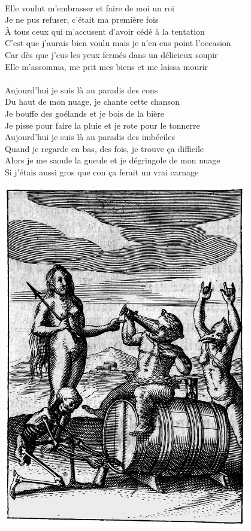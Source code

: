 \\Elle voulut m'embrasser et faire de moi un roi
\\Je ne pus refuser, c'était ma première fois
\\À tous ceux qui m'accusent d'avoir cédé à la tentation
\\C'est que j'aurais bien voulu mais je n'en eus point l'occasion
\\Car dès que j'eus les yeux fermés dans un délicieux soupir
\\Elle m'assomma, me prit mes biens et me laissa mourir
\\\\Aujourd'hui je suis là au paradis des cons
\\Du haut de mon nuage, je chante cette chanson
\\Je bouffe des goélands et je bois de la bière
\\Je pisse pour faire la pluie et je rote pour le tonnerre
\\Aujourd'hui je suis là au paradis des imbéciles
\\Quand je regarde en bas, des fois, je trouve ça difficile
\\Alors je me saoule la gueule et je dégringole de mon nuage
\\Si j'étais aussi gros que con ça ferait un vrai carnage
\bigskip
\bigskip
\begin{center}
\centering
    \includegraphics[width=0.8\textwidth]{images/brev1.png}
 \end{center}
\breakpage